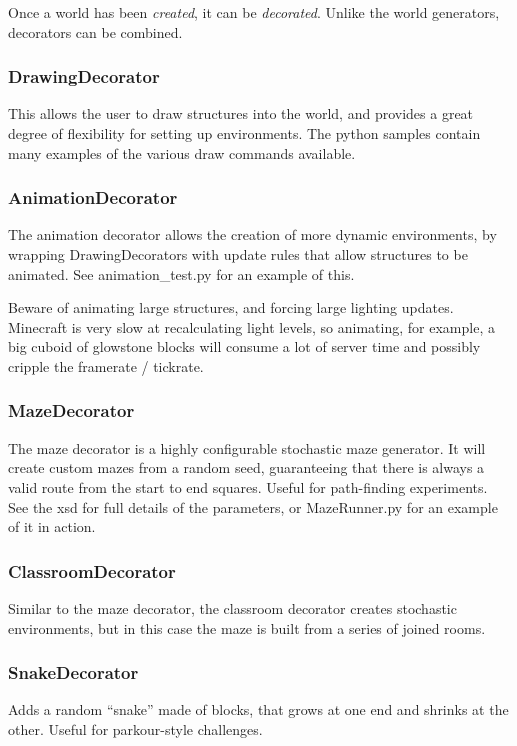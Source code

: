 \documentclass[11pt]{article} %
\begin{document}
Once a world has been \emph{created}, it can be \emph{decorated}. Unlike the world generators, decorators can be combined.

\subsubsection{DrawingDecorator}
This allows the user to draw structures into the world, and provides a great degree of flexibility for setting up environments. The python samples contain many examples of the various draw commands available.

\subsubsection{AnimationDecorator}
The animation decorator allows the creation of more dynamic environments, by wrapping DrawingDecorators with update rules that allow structures to be animated. See animation\_test.py for an example of this.

\begin{mdframed}[style=tipFrame]
Beware of animating large structures, and forcing large lighting updates. Minecraft is very slow at recalculating light levels, so animating, for example, a big cuboid of glowstone blocks will consume a lot of server time and possibly cripple the framerate / tickrate.
\end{mdframed}

\subsubsection{MazeDecorator}
The maze decorator is a highly configurable stochastic maze generator. It will create custom mazes from a random seed, guaranteeing that there is always a valid route from the start to end squares. Useful for path-finding experiments. See the xsd for full details of the parameters, or MazeRunner.py for an example of it in action.

\subsubsection{ClassroomDecorator}
Similar to the maze decorator, the classroom decorator creates stochastic environments, but in this case the maze is built from a series of joined rooms.

\subsubsection{SnakeDecorator}
Adds a random ``snake'' made of blocks, that grows at one end and shrinks at the other. Useful for parkour-style challenges.
\end{document}
